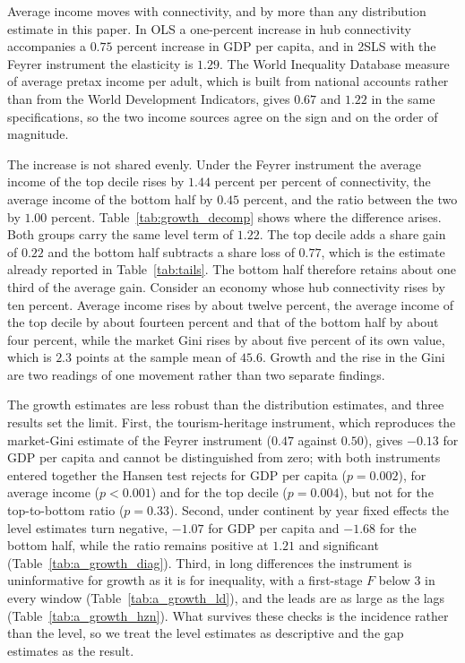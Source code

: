 Average income moves with connectivity, and by more than any distribution estimate in this paper. In OLS a one-percent increase in hub connectivity accompanies a $0.75$ percent increase in GDP per capita, and in 2SLS with the Feyrer instrument the elasticity is $1.29$. The World Inequality Database measure of average pretax income per adult, which is built from national accounts rather than from the World Development Indicators, gives $0.67$ and $1.22$ in the same specifications, so the two income sources agree on the sign and on the order of magnitude.

The increase is not shared evenly. Under the Feyrer instrument the average income of the top decile rises by $1.44$ percent per percent of connectivity, the average income of the bottom half by $0.45$ percent, and the ratio between the two by $1.00$ percent. Table~\ref{tab:growth_decomp} shows where the difference arises. Both groups carry the same level term of $1.22$. The top decile adds a share gain of $0.22$ and the bottom half subtracts a share loss of $0.77$, which is the estimate already reported in Table~\ref{tab:tails}. The bottom half therefore retains about one third of the average gain. Consider an economy whose hub connectivity rises by ten percent. Average income rises by about twelve percent, the average income of the top decile by about fourteen percent and that of the bottom half by about four percent, while the market Gini rises by about five percent of its own value, which is $2.3$ points at the sample mean of $45.6$. Growth and the rise in the Gini are two readings of one movement rather than two separate findings.

The growth estimates are less robust than the distribution estimates, and three results set the limit. First, the tourism-heritage instrument, which reproduces the market-Gini estimate of the Feyrer instrument ($0.47$ against $0.50$), gives $-0.13$ for GDP per capita and cannot be distinguished from zero; with both instruments entered together the Hansen test rejects for GDP per capita ($p=0.002$), for average income ($p<0.001$) and for the top decile ($p=0.004$), but not for the top-to-bottom ratio ($p=0.33$). Second, under continent by year fixed effects the level estimates turn negative, $-1.07$ for GDP per capita and $-1.68$ for the bottom half, while the ratio remains positive at $1.21$ and significant (Table~\ref{tab:a_growth_diag}). Third, in long differences the instrument is uninformative for growth as it is for inequality, with a first-stage $F$ below $3$ in every window (Table~\ref{tab:a_growth_ld}), and the leads are as large as the lags (Table~\ref{tab:a_growth_hzn}). What survives these checks is the incidence rather than the level, so we treat the level estimates as descriptive and the gap estimates as the result.


